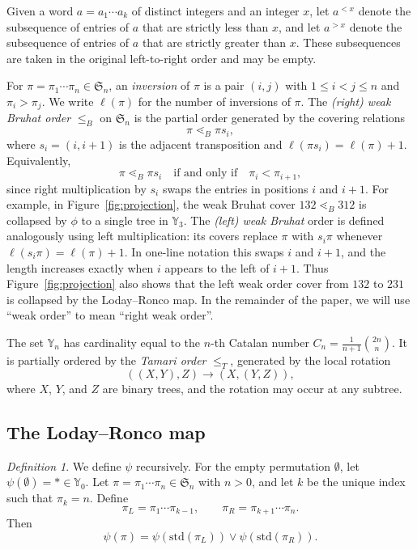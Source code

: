 \documentclass[a4paper]{article}
\theoremstyle{plain}
\theoremstyle{definition}
\theoremstyle{remark}
\numberwithin{equation}{section}
\renewcommand{\le}{\leqslant}\renewcommand{\ge}{\geqslant}
\newcommand{\Sym}{\mathfrak{S}}
\newcommand{\Y}{\mathbb{Y}}
\newcommand{\std}{\mathrm{std}}
\newtheorem{definition}[theorem]{Definition}
\begin{document}
Given a word \(a=a_1\cdots a_k\) of distinct integers and an integer \(x\),
let \(a^{<x}\) denote the subsequence of entries of \(a\) that are strictly
less than \(x\), and let \(a^{>x}\) denote the subsequence of entries of \(a\)
that are strictly greater than \(x\). These subsequences are taken in the
original left-to-right order and may be empty.

For \(\pi=\pi_1\cdots\pi_n\in\Sym_n\), an \emph{inversion} of \(\pi\) is a pair
\((i,j)\) with \(1\le i<j\le n\) and \(\pi_i>\pi_j\). We write \(\ell(\pi)\)
for the number of inversions of \(\pi\). The \emph{(right) weak Bruhat order}
\(\le_B\) on \(\Sym_n\) is the partial order generated by the covering relations
\[
\pi \lessdot_B \pi s_i,
\]
where \(s_i=(i,i+1)\) is the adjacent transposition and $\ell(\pi s_i)=\ell(\pi)+1$. Equivalently,
\[
\pi \lessdot_B \pi s_i
\quad\text{if and only if}\quad
\pi_i<\pi_{i+1},
\]
since right multiplication by \(s_i\) swaps the entries in positions \(i\) and
\(i+1\). For example, in Figure~\ref{fig:projection}, the weak Bruhat cover \(132\lessdot_B 312\) is collapsed by \(\phi\) to a single tree in \(\Y_3\). The \emph{(left) weak Bruhat} order is defined analogously using left multiplication: its covers replace \(\pi\) with \(s_i\pi\) whenever \(\ell(s_i\pi)=\ell(\pi)+1\). In one-line notation this swaps \(i\) and \(i+1\), and the length increases exactly when \(i\) appears to the left of \(i+1\). Thus Figure~\ref{fig:projection} also shows that the left weak order cover from \(132\) to \(231\) is collapsed by the Loday--Ronco map. In the remainder of the paper, we will use ``weak order'' to mean ``right weak order''.

The set \(\Y_n\) has cardinality equal to the \(n\)-th Catalan number $C_n=\frac{1}{n+1}\binom{2n}{n}$.  It is partially ordered by the \emph{Tamari order} \(\le_T\), generated by the local rotation
\[
((X,Y),Z)\longrightarrow (X,(Y,Z)),
\]
where \(X\), \(Y\), and \(Z\) are binary trees, and the rotation may occur at any subtree.



\subsection{The Loday--Ronco map}


\begin{definition}
We define \(\psi\) recursively. For the empty permutation \(\emptyset\), let $\psi(\emptyset)=\ast\in\Y_0$. Let \(\pi=\pi_1\cdots\pi_n\in\Sym_n\) with \(n>0\), and let \(k\) be the unique index such that \(\pi_k=n\). Define
    \[
    \pi_L=\pi_1\cdots\pi_{k-1},
    \qquad
    \pi_R=\pi_{k+1}\cdots\pi_n.
    \]
    Then
    \[
    \psi(\pi)=\psi(\std(\pi_L))\vee\psi(\std(\pi_R)).
    \]
\end{definition}
\end{document}
